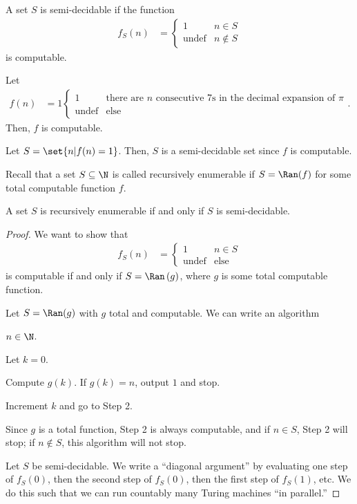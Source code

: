 \documentclass[10pt]{mypackage}
\begin{document}
\begin{definition}
  A set $S$ is semi-decidable if the function
  \begin{align*}
    f_{S}\left(n\right) &= \begin{cases}
      1 & n\in S\\
      \text{undef} & n\notin S
    \end{cases}
  \end{align*}
  is computable.
\end{definition}
\begin{example}
  Let
  \begin{align*}
    f(n) &= 1 \begin{cases}
      1 & \text{there are $n$ consecutive $7$s in the decimal expansion of $\pi$}\\
      \text{undef} & \text{else}
    \end{cases}.
  \end{align*}
  Then, $f$ is computable.\newline

  Let $S = \set{n | f(n) = 1}$. Then, $S$ is a semi-decidable set since $f$ is computable.
\end{example}
Recall that a set $S\subseteq \N$ is called recursively enumerable if $S= \Ran(f)$ for some total computable function $f$.
\begin{theorem}
  A set $S$ is recursively enumerable if and only if $S$ is semi-decidable.
\end{theorem}
\begin{proof}
  We want to show that
  \begin{align*}
    f_S(n) &= \begin{cases}
      1 & n\in S\\
      \text{undef} & \text{else}
    \end{cases}
  \end{align*}
  is computable if and only if $S = \Ran\left(g\right)$, where $g$ is some total computable function.\newline

  Let $S = \Ran(g)$ with $g$ total and computable. We can write an algorithm
  \begin{description}[font=\normalfont\scshape]\itemsep=-2pt
    \item[Input:] $n\in \N$.
    \item[Step 1:] Let $k = 0$.
    \item[Step 2:] Compute $g(k)$. If $g(k) = n$, output $1$ and stop.
    \item[Step 3:] Increment $k$ and go to Step 2.
  \end{description}
  Since $g$ is a total function, Step 2 is always computable, and if $n\in S$, Step 2 will stop; if $n\notin S$, this algorithm will not stop.\newline

  Let $S$ be semi-decidable. We write a ``diagonal argument'' by evaluating one step of $f_S(0)$, then the second step of $f_S(0)$, then the first step of $f_S(1)$, etc. We do this such that we can run countably many Turing machines ``in parallel.''
\end{proof}
\end{document}
